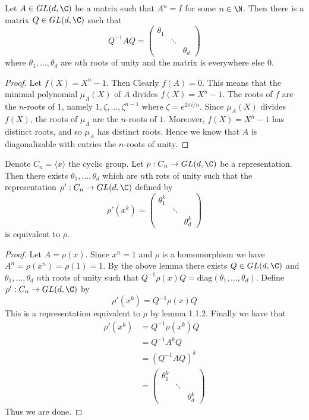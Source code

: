 \documentclass[a4paper]{article}
\begin{document}
\begin{lmm}{}{} Let $A\in GL(d,\C)$ be a matrix such that $A^n=I$ for some $n\in\N$. Then there is a matrix $Q\in GL(d,\C)$ such that $$Q^{-1}AQ=\begin{pmatrix}
\theta_1 & & \\
& \ddots &\\
& & \theta_d
\end{pmatrix}$$ where $\theta_1,\dots,\theta_d$ are $n$th roots of unity and the matrix is everywhere else $0$. \tcbline
\begin{proof}
Let $f(X)=X^n-1$. Then Clearly $f(A)=0$. This means that the minimal polynomial $\mu_A(X)$ of $A$ divides $f(X)=X^n-1$. The roots of $f$ are the $n$-roots of $1$, namely $1,\zeta,\dots,\zeta^{n-1}$ where $\zeta=e^{2\pi i/n}$. Since $\mu_A(X)$ divides $f(X)$, the roots of $\mu_A$ are the $n$-roots of $1$. Moreover, $f(X)=X^n-1$ has distinct roots, and so $\mu_A$ has distinct roots. Hence we know that $A$ is diagonalizable with entries the $n$-roots of unity. 
\end{proof}
\end{lmm}

\begin{thm}{}{} Denote $C_n=\langle x\rangle$ the cyclic group. Let $\rho:C_n\to GL(d,\C)$ be a representation. Then there exists $\theta_1,\dots,\theta_d$ which are $n$th rots of unity such that the representation $\rho':C_n\to GL(d,\C)$ defined by $$\rho'(x^k)=\begin{pmatrix}
\theta_1^k & & \\
& \ddots &\\
& & \theta_d^k
\end{pmatrix}$$ is equivalent to $\rho$. \tcbline
\begin{proof}
Let $A=\rho(x)$. Since $x^n=1$ and $\rho$ is a homomorphism we have $A^n=\rho(x^n)=\rho(1)=1$. By the above lemma there exists $Q\in GL(d,\C)$ and $\theta_1,\dots,\theta_d$ $n$th roots of unity such that $Q^{-1}\rho(x)Q=\text{diag}(\theta_1,\dots,\theta_d)$. Define $\rho':C_n\to GL(d,\C)$ by $$\rho'(x^k)=Q^{-1}\rho(x)Q$$ This is a representation equivalent to $\rho$ by lemma 1.1.2. Finally we have that 
\begin{align*}
\rho'(x^k)&=Q^{-1}\rho(x^k)Q\\
&=Q^{-1}A^kQ\\
&=(Q^{-1}AQ)^k\\
&=\begin{pmatrix}
\theta_1^k & & \\
& \ddots &\\
& & \theta_d^k
\end{pmatrix}
\end{align*} Thus we are done. 
\end{proof}
\end{thm}
\end{document}
